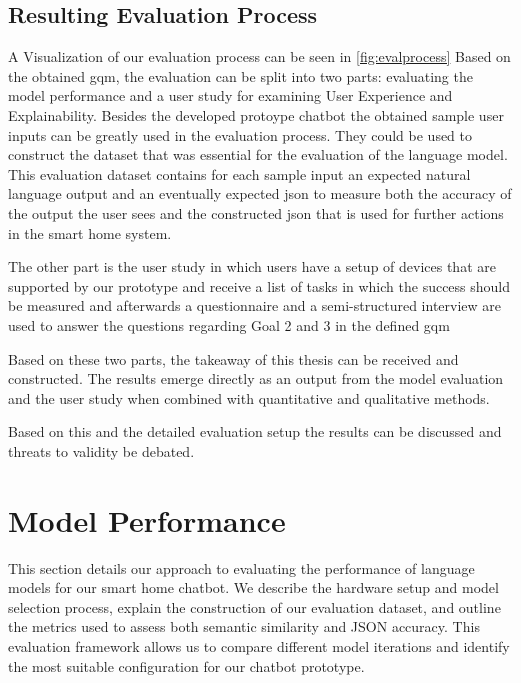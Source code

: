 \subsection{Resulting Evaluation Process}
A Visualization of our evaluation process can be seen in \cref{fig:evalprocess}
Based on the obtained \gls{gqm}, the evaluation can be split into two parts: evaluating the model performance and a user study for examining User Experience and Explainability.
Besides the developed protoype chatbot the obtained sample user inputs can be greatly used in the evaluation process.
They could be used to construct the dataset that was essential for the evaluation of the language model.
This evaluation dataset contains for each sample input an expected natural language output and an eventually expected \gls{json} to measure both the accuracy of the output the user sees and the constructed \gls{json} that is used for further actions in the smart home system.

The other part is the user study in which users have a setup of devices that are supported by our prototype and receive a list of tasks in which the success should be measured and afterwards a questionnaire and a semi-structured interview are used to answer the questions regarding Goal 2 and 3 in the defined \gls{gqm}

Based on these two parts, the takeaway of this thesis can be received and constructed.
The results emerge directly as an output from the model evaluation and the user study when combined with quantitative and qualitative methods.

Based on this and the detailed evaluation setup the results can be discussed and threats to validity be debated.


\section{Model Performance}
\label{sec:modelperform}
This section details our approach to evaluating the performance of language models for our smart home chatbot. We describe the hardware setup and model selection process, explain the construction of our evaluation dataset, and outline the metrics used to assess both semantic similarity and JSON accuracy. This evaluation framework allows us to compare different model iterations and identify the most suitable configuration for our chatbot prototype.

